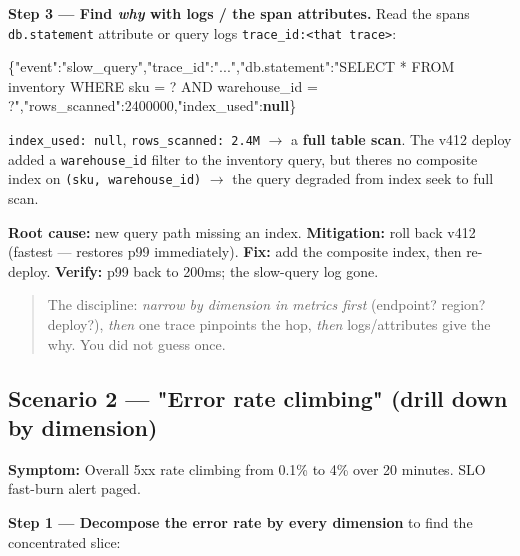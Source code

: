 \documentclass[11pt]{article}
\newenvironment{Shaded}{\begin{snugshade}}{\end{snugshade}}
\newcommand{\DataTypeTok}[1]{\textcolor[rgb]{0.16,0.50,0.73}{#1}}
\newcommand{\DecValTok}[1]{\textcolor[rgb]{0.96,0.45,0.00}{#1}}
\newcommand{\FunctionTok}[1]{\textcolor[rgb]{0.56,0.27,0.68}{#1}}
\newcommand{\KeywordTok}[1]{\textcolor[rgb]{0.81,0.81,0.76}{\textbf{#1}}}
\newcommand{\StringTok}[1]{\textcolor[rgb]{0.96,0.31,0.31}{#1}}
\begin{document}
\textbf{Step 3 --- Find \emph{why} with logs / the span attributes.} Read the span\textquotesingle s \texttt{db.statement} attribute or query logs \texttt{trace\_id:\textless{}that\ trace\textgreater{}}:


\begin{Shaded}
\begin{Highlighting}[]
\FunctionTok{\{}\DataTypeTok{"event"}\FunctionTok{:}\StringTok{"slow\_query"}\FunctionTok{,}\DataTypeTok{"trace\_id"}\FunctionTok{:}\StringTok{"..."}\FunctionTok{,}\DataTypeTok{"db.statement"}\FunctionTok{:}\StringTok{"SELECT * FROM inventory WHERE sku = ? AND warehouse\_id = ?"}\FunctionTok{,}\DataTypeTok{"rows\_scanned"}\FunctionTok{:}\DecValTok{2400000}\FunctionTok{,}\DataTypeTok{"index\_used"}\FunctionTok{:}\KeywordTok{null}\FunctionTok{\}}
\end{Highlighting}
\end{Shaded}

\texttt{index\_used:\ null}, \texttt{rows\_scanned:\ 2.4M} \(\rightarrow\) a \textbf{full table scan}. The v412 deploy added a \texttt{warehouse\_id} filter to the inventory query, but there\textquotesingle s no composite index on \texttt{(sku,\ warehouse\_id)} \(\rightarrow\) the query degraded from index seek to full scan.

\textbf{Root cause:} new query path missing an index. \textbf{Mitigation:} roll back v412 (fastest --- restores p99 immediately). \textbf{Fix:} add the composite index, then re-deploy. \textbf{Verify:} p99 back to 200ms; the slow-query log gone.

\begin{quote}
The discipline: \emph{narrow by dimension in metrics first} (endpoint? region? deploy?), \emph{then} one trace pinpoints the hop, \emph{then} logs/attributes give the why. You did not guess once.
\end{quote}

\subsection{Scenario 2 --- "Error rate climbing" (drill down by dimension)}\label{scenario-2--error-rate-climbing-drill-down-by-dimension}

\textbf{Symptom:} Overall 5xx rate climbing from 0.1\% to 4\% over 20 minutes. SLO fast-burn alert paged.

\textbf{Step 1 --- Decompose the error rate by every dimension} to find the concentrated slice:
\end{document}
